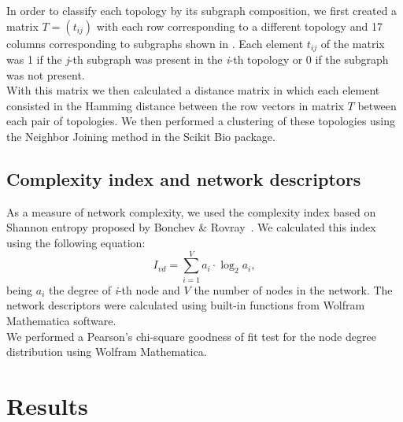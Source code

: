 \documentclass[10pt,letterpaper]{article}
\begin{document}
In order to classify each topology by its subgraph composition, we first created
a matrix  $T = (t_{ij})$ with each row corresponding to a different topology
and 17 columns corresponding to subgraphs shown in .
Each element $t_{ij}$ of
the matrix was 1 if the \emph{j}-th subgraph was present in the \emph{i}-th
topology or 0 if the subgraph was not present.\\

With this matrix we then calculated a distance matrix in which each element
consisted in the Hamming distance between the row vectors in matrix $T$ between
each pair of topologies. We then performed a clustering of these topologies
using the Neighbor Joining method in the Scikit Bio package.

\subsection*{Complexity index and network descriptors}

As a measure of network complexity, we used the complexity index based on
Shannon entropy proposed by Bonchev \& Rovray~\cite{D.2005}. We calculated this
index using the following equation:
\begin{equation}
 I_{vd} = \sum_{i=1}^V a_i \cdot \log_{2} a_i,
\end{equation}
\noindent
being $a_i$ the degree of \emph{i}-th node and $V$ the number of nodes in the
network. The network descriptors were calculated using built-in functions from
Wolfram Mathematica software.\\

We performed a Pearson’s chi-square goodness of fit test for the node degree
distribution using Wolfram Mathematica.



\section*{Results}
\end{document}
